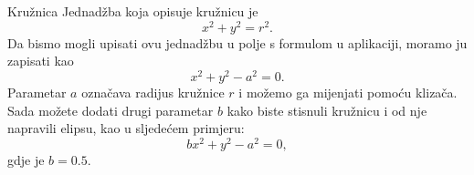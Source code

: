 \begin{surferPage}[Circle]{Kru\v znica}
Jednad\v zba koja opisuje kru\v znicu je
\[x^2+y^2=r^2.\]
Da bismo mogli upisati ovu jednad\v zbu u polje s formulom u aplikaciji, moramo ju zapisati kao
\[x^2+y^2-a^2=0.\]
Parametar $a$ ozna\v cava radijus kru\v znice $r$ i mo\v zemo ga mijenjati pomo\' cu kliza\v ca. Sada mo\v zete dodati drugi parametar $b$ kako biste stisnuli kru\v znicu i od nje napravili elipsu, kao u sljede\' cem primjeru:
\[bx^2+y^2-a^2=0,\] gdje je $b=0.5$.
\end{surferPage}
